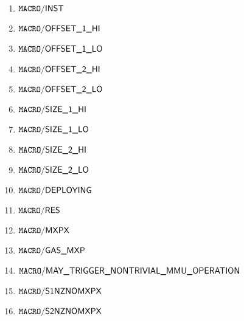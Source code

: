 \begin{enumerate}
	\item $\mxpMacroInst$
	\item $\mxpMacroOffsetOneHi$
	\item $\mxpMacroOffsetOneLo$
	\item $\mxpMacroOffsetTwoHi$
	\item $\mxpMacroOffsetTwoLo$
	\item $\mxpMacroSizeOneHi$
	\item $\mxpMacroSizeOneLo$
	\item $\mxpMacroSizeTwoHi$
	\item $\mxpMacroSizeTwoLo$
	\item $\mxpMacroDeploying$
	\item $\mxpMacroRes$
	\item $\mxpMacroMxpx$
	\item $\mxpMacroGasMxp$
	\item $\mxpMacroMayTriggerNontrivialMmuOperation$
	\item $\mxpMacroSOneNzNoMxpx$
	\item $\mxpMacroSTwoNzNoMxpx$
\end{enumerate}
